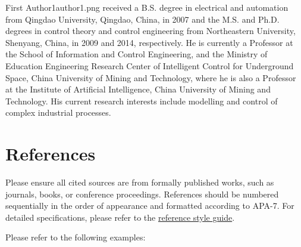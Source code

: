 \documentclass{jcd}
\theoremstyle{plain}
\theoremstyle{definition}
\begin{document}
\begin{contributor}{First Author1}{author1.png}%
received a B.S. degree in electrical and automation from Qingdao
University, Qingdao, China, in 2007 and the M.S. and Ph.D. degrees in control theory
and control engineering from Northeastern University, Shenyang, China, in
2009 and 2014, respectively. He is currently a Professor at the School of
Information and Control Engineering, and the Ministry of Education
Engineering Research Center of Intelligent Control for
Underground Space, China University of Mining and Technology,
where he is also a Professor at the Institute of Artificial
Intelligence, China University of Mining and Technology. His current research
interests include modelling and control of complex industrial processes.
\end{contributor}


\backmatter

\section{References}

\normalsize

Please ensure all cited sources are from formally published works, such as journals, books, or conference proceedings. References should be numbered sequentially in the order of appearance and formatted according to APA-7. For detailed specifications, please refer to the \href{https://files.taylorandfrancis.com/tf_APA.pdf}{reference style guide}.

Please refer to the following examples:

% 
\end{document}
